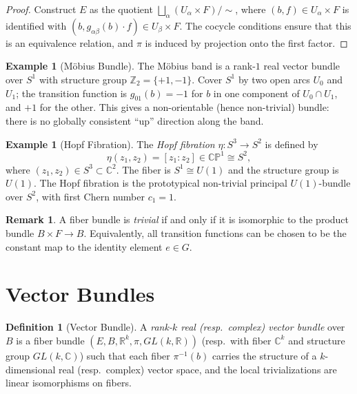 \documentclass[12pt,a4paper]{amsart}
\theoremstyle{definition}
\newtheorem{definition}[theorem]{Definition}
\newtheorem{example}[theorem]{Example}
\newtheorem{remark}[theorem]{Remark}
\begin{document}
\begin{proof}
Construct $E$ as the quotient
$\bigsqcup_\alpha (U_\alpha \times F) / {\sim}$,
where $(b, f) \in U_\alpha \times F$ is identified with
$(b, g_{\alpha\beta}(b) \cdot f) \in U_\beta \times F$.
The cocycle conditions ensure that this is an equivalence relation, and $\pi$
is induced by projection onto the first factor.
\end{proof}

\begin{example}[M\"{o}bius Bundle]
The M\"{o}bius band is a rank-$1$ real vector bundle over $S^1$ with structure
group $\mathbb{Z}_2 = \{+1, -1\}$. Cover $S^1$ by two open arcs $U_0$ and
$U_1$; the transition function is $g_{01}(b) = -1$ for $b$ in one component of
$U_0 \cap U_1$, and $+1$ for the other. This gives a non-orientable (hence
non-trivial) bundle: there is no globally consistent ``up'' direction along the
band.
\end{example}

\begin{example}[Hopf Fibration]
The \emph{Hopf fibration} $\eta \colon S^3 \to S^2$ is defined by
\[
  \eta(z_1, z_2) = [z_1 : z_2] \in \mathbb{CP}^1 \cong S^2,
\]
where $(z_1, z_2) \in S^3 \subset \mathbb{C}^2$. The fiber is $S^1 \cong U(1)$
and the structure group is $U(1)$. The Hopf fibration is the prototypical
non-trivial principal $U(1)$-bundle over $S^2$, with first Chern number $c_1 = 1$.
\end{example}

\begin{remark}
A fiber bundle is \emph{trivial} if and only if it is isomorphic to the product
bundle $B \times F \to B$. Equivalently, all transition functions can be chosen
to be the constant map to the identity element $e \in G$.
\end{remark}

\section{Vector Bundles}
\label{sec:vector}

\begin{definition}[Vector Bundle]
A \emph{rank-$k$ real (resp.\ complex) vector bundle} over $B$ is a fiber
bundle $(E, B, \mathbb{R}^k, \pi, GL(k,\mathbb{R}))$ (resp.\ with fiber
$\mathbb{C}^k$ and structure group $GL(k,\mathbb{C})$) such that each fiber
$\pi^{-1}(b)$ carries the structure of a $k$-dimensional real (resp.\ complex)
vector space, and the local trivializations are linear isomorphisms on fibers.
\end{definition}
\end{document}
